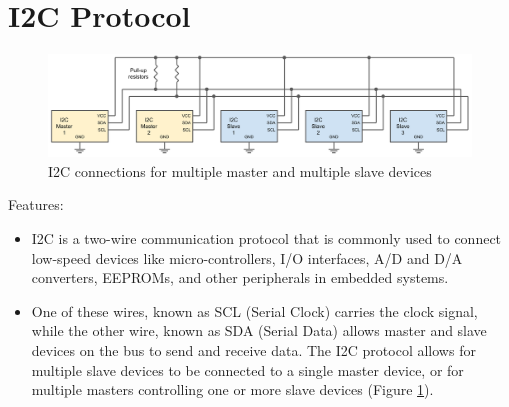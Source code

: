 \newpage
\section{I2C Protocol}

\begin{figure}[h!]
\centering
\includegraphics[width=\columnwidth]{./Figures/I2C_multi_master.png}
\caption{I2C connections for multiple master and multiple slave devices}
\label{I2C_multi_master}
\end{figure}

Features:
\begin{itemize}
    \item I2C is a two-wire communication protocol that is commonly used to connect low-speed devices like micro-controllers, I/O interfaces, A/D and D/A converters, EEPROMs, and other peripherals in embedded systems.
    \item One of these wires, known as SCL (Serial Clock) carries the clock signal, while the other wire, known as SDA (Serial Data) allows master and slave devices on the bus to send and receive data. The I2C protocol allows for multiple slave devices to be connected to a single master device, or for multiple masters controlling one or more slave devices (Figure \ref{I2C_multi_master}).
\end{itemize}
